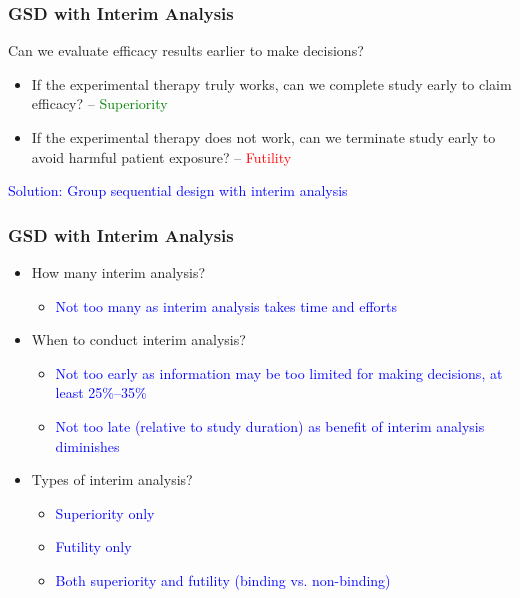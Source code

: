 \documentclass{beamer}
\begin{document}
\begin{frame}
	\frametitle{GSD with Interim Analysis}
Can we evaluate efficacy results earlier to make decisions? \begin{itemize}
  \item If the experimental therapy truly works, can we complete study early to claim efficacy? -- \textcolor{green}{Superiority}
  \item If the experimental therapy does not work, can we terminate study early to avoid harmful patient exposure? -- \textcolor{red}{Futility}
\end{itemize}

\textcolor{blue}{Solution: Group sequential design with interim analysis} 
\end{frame}
\begin{frame}
	\frametitle{GSD with Interim Analysis}
 \begin{itemize}
		\item How many interim analysis? \begin{itemize}
		\item \textcolor{blue}{Not too many as interim analysis takes time and efforts} 
		\end{itemize}
		\item When to conduct interim analysis? \begin{itemize}
		\item \textcolor{blue}{Not too early as information may be too limited for making decisions, at least 25\%--35\%}
		\item \textcolor{blue}{Not too late (relative to study duration) as benefit of interim analysis diminishes} 
		\end{itemize}
		\item Types of interim analysis? \begin{itemize}
		\item \textcolor{blue}{Superiority only}
		\item \textcolor{blue}{Futility only}
		\item \textcolor{blue}{Both superiority and futility (binding vs. non-binding)}
		\end{itemize}
	\end{itemize}
	

\end{frame}
\end{document}
